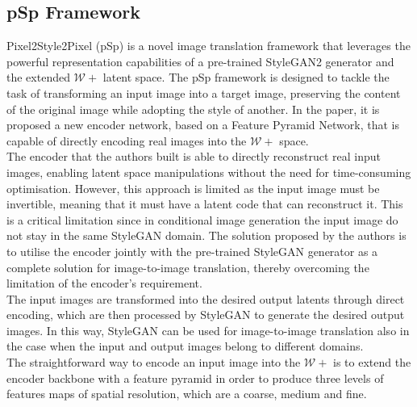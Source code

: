\subsection{pSp Framework}
\label{section:pspFramework}
Pixel2Style2Pixel (pSp) is a novel image translation framework that leverages the powerful representation capabilities of a pre-trained StyleGAN2 generator and the extended $\mathcal{W}+$ latent space. The pSp framework is designed to tackle the task of transforming an input image into a target image, preserving the content of the original image while adopting the style of another.
In the paper, it is proposed a new encoder network, based on a Feature Pyramid Network, that is capable of directly encoding real images into the $\mathcal{W}+$ space. \\
The encoder that the authors built is able to directly reconstruct real input images, enabling latent space manipulations without the need for time-consuming optimisation. However, this approach is limited as the input image must be invertible, meaning that it must have a latent code that can reconstruct it. This is a critical limitation since in conditional image generation the input image do not stay in the same StyleGAN domain. The solution proposed by the authors is to utilise the encoder jointly with the pre-trained StyleGAN generator as a complete solution for image-to-image translation, thereby overcoming the limitation of the encoder's requirement. \\
The input images are transformed into the desired output latents through direct encoding, which are then processed by StyleGAN to generate the desired output images. In this way, StyleGAN can be used for image-to-image translation also in the case when the input and output images belong to different domains.\\
The straightforward way to encode an input image into the $\mathcal{W}+$ is to extend the encoder backbone with a feature pyramid in order to produce three levels of features maps of spatial resolution, which are a coarse, medium and fine.
